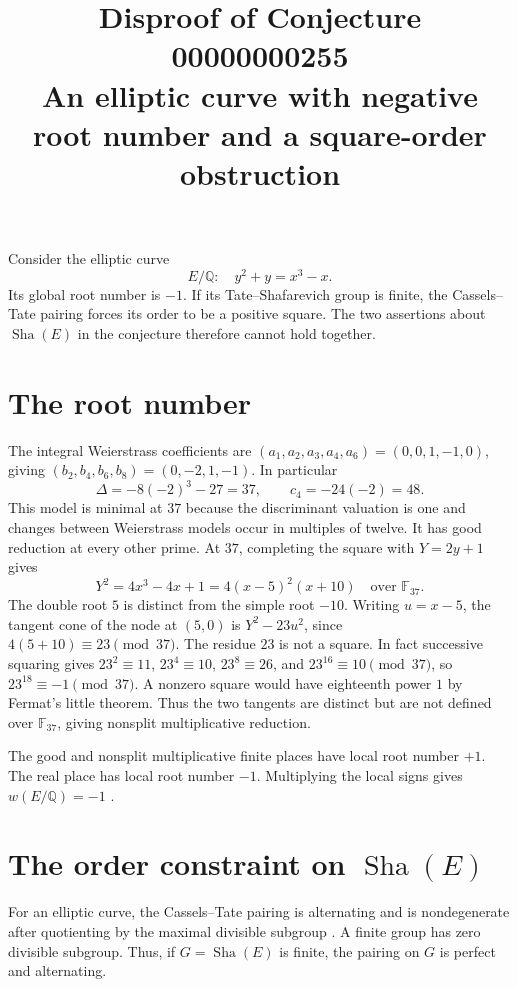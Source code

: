 \documentclass[11pt]{article}
\title{Disproof of Conjecture 00000000255\\
\large An elliptic curve with negative root number and a square-order obstruction}
\author{}
\date{}
\newcommand{\Sha}{\operatorname{Sha}}
\begin{document}
\maketitle

Consider the elliptic curve
\[
  E/\mathbb Q:\quad y^2+y=x^3-x.
\]
Its global root number is \(-1\). If its Tate--Shafarevich group
is finite, the Cassels--Tate pairing forces its order to be a
positive square. The two assertions about \(\Sha(E)\) in the
conjecture therefore cannot hold together.

\section*{The root number}

The integral Weierstrass coefficients are
\((a_1,a_2,a_3,a_4,a_6)=(0,0,1,-1,0)\), giving
\((b_2,b_4,b_6,b_8)=(0,-2,1,-1)\). In particular
\[
  \Delta=-8(-2)^3-27=37,\qquad c_4=-24(-2)=48.
\]
This model is minimal at \(37\) because the discriminant valuation
is one and changes between Weierstrass models occur in multiples
of twelve. It has good reduction at every other prime.
At \(37\), completing the square with \(Y=2y+1\) gives
\[
  Y^2=4x^3-4x+1=4(x-5)^2(x+10)\quad\text{over }\mathbb F_{37}.
\]
The double root \(5\) is distinct from the simple root \(-10\).
Writing \(u=x-5\), the tangent cone of the node at \((5,0)\)
is \(Y^2-23u^2\), since \(4(5+10)\equiv23\pmod{37}\).
The residue \(23\) is not a square. In fact successive squaring
gives \(23^2\equiv11\), \(23^4\equiv10\),
\(23^8\equiv26\), and \(23^{16}\equiv10\pmod{37}\),
so \(23^{18}\equiv-1\pmod{37}\). A nonzero square would have
eighteenth power \(1\) by Fermat's little theorem.
Thus the two tangents are distinct but are not defined over
\(\mathbb F_{37}\), giving nonsplit multiplicative reduction.

The good and nonsplit multiplicative finite places have local
root number \(+1\). The real place has local root number \(-1\).
Multiplying the local signs gives \(w(E/\mathbb Q)=-1\)
\cite[Example~3.22 and Section~8.1]{dokchitser}.

\section*{The order constraint on \(\Sha(E)\)}

For an elliptic curve, the Cassels--Tate pairing is alternating
and is nondegenerate after quotienting by the maximal divisible
subgroup \cite[Introduction]{poonen-stoll}. A finite group has
zero divisible subgroup. Thus, if \(G=\Sha(E)\) is finite,
the pairing on \(G\) is perfect and alternating.
\end{document}
